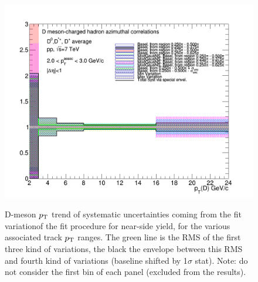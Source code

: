 \begin{figure}[!htbp]
{\includegraphics[width=0.48\linewidth, height=0.33\linewidth]{figures/FitOutput/BaselineSystematicSourcesNSYield_pthad2to3.png}}
\caption{D-meson $p_{\rm T}$ trend of systematic uncertainties coming from the fit variationof the fit procedure for near-side yield, for the various associated track $p_{\rm T}$ ranges. The green line is the RMS of the first three kind of variations, the black the envelope between this RMS and fourth kind of variations (baseline shifted by 1$\sigma$ stat). Note: do not consider the first bin of each panel (excluded from the results).}
\label{fig:NSyieldUnc}
\end{figure}
